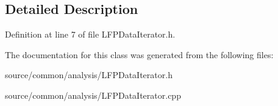 \subsection{Detailed Description}


Definition at line 7 of file L\-F\-P\-Data\-Iterator.\-h.



The documentation for this class was generated from the following files\-:\begin{DoxyCompactItemize}
\item 
source/common/analysis/L\-F\-P\-Data\-Iterator.\-h\item 
source/common/analysis/L\-F\-P\-Data\-Iterator.\-cpp\end{DoxyCompactItemize}
